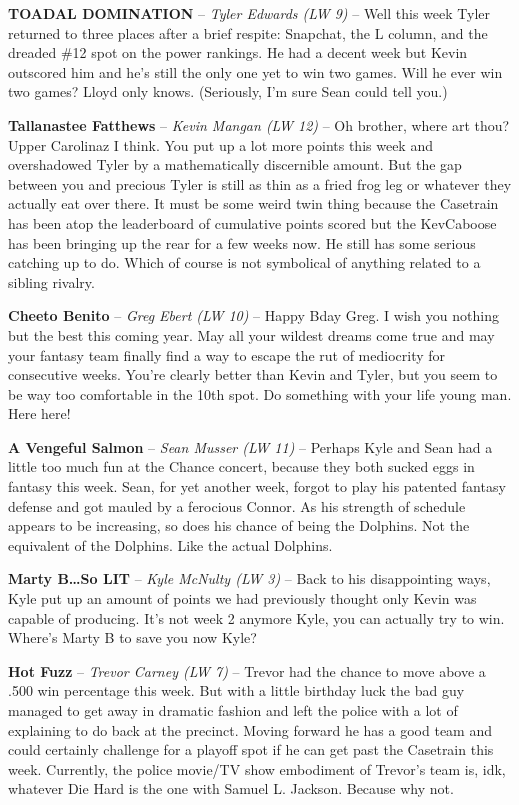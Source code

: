 \documentclass[11pt,letterpaper]{article}
\begin{document}
\newpage
{}
\begin{etaremune}
\item \textbf{TOADAL DOMINATION} -- \textit{Tyler Edwards (LW 9)} -- Well this week Tyler returned to three places after a brief respite: Snapchat, the L column, and the dreaded \#12 spot on the power rankings. He had a decent week but Kevin outscored him and he's still the only one yet to win two games. Will he ever win two games? Lloyd only knows. (Seriously, I'm sure Sean could tell you.)
\item \textbf{Tallanastee Fatthews} -- \textit{Kevin Mangan (LW 12)} -- Oh brother, where art thou? Upper Carolinaz I think. You put up a lot more points this week and overshadowed Tyler by a mathematically discernible amount. But the gap between you and precious Tyler is still as thin as a fried frog leg or whatever they actually eat over there. It must be some weird twin thing because the Casetrain has been atop the leaderboard of cumulative points scored but the KevCaboose has been bringing up the rear for a few weeks now. He still has some serious catching up to do. Which of course is not symbolical of anything related to a sibling rivalry. 
\item \textbf{Cheeto Benito} -- \textit{Greg Ebert (LW 10)} -- Happy Bday Greg. I wish you nothing but the best this coming year. May all your wildest dreams come true and may your fantasy team finally find a way to escape the rut of mediocrity for consecutive weeks. You're clearly better than Kevin and Tyler, but you seem to be way too comfortable in the 10th spot. Do something with your life young man. Here here!
\item \textbf{A Vengeful Salmon} -- \textit{Sean Musser (LW 11)} -- Perhaps Kyle and Sean had a little too much fun at the Chance concert, because they both sucked eggs in fantasy this week. Sean, for yet another week, forgot to play his patented fantasy defense and got mauled by a ferocious Connor. As his strength of schedule appears to be increasing, so does his chance of being the Dolphins. Not the equivalent of the Dolphins. Like the actual Dolphins.
\item \textbf{Marty B\dots So LIT} -- \textit{Kyle McNulty (LW 3)} -- Back to his disappointing ways, Kyle put up an amount of points we had previously thought only Kevin was capable of producing. It's not week 2 anymore Kyle, you can actually try to win. Where's Marty B to save you now Kyle? 
\item \textbf{Hot Fuzz} -- \textit{Trevor Carney (LW 7)} -- Trevor had the chance to move above a .500 win percentage this week. But with a little birthday luck the bad guy managed to get away in dramatic fashion and left the police with a lot of explaining to do back at the precinct. Moving forward he has a good team and could certainly challenge for a playoff spot if he can get past the Casetrain this week. Currently, the police movie/TV show embodiment of Trevor's team is, idk, whatever Die Hard is the one with Samuel L. Jackson. Because why not. 

\end{etaremune}
\end{document}
